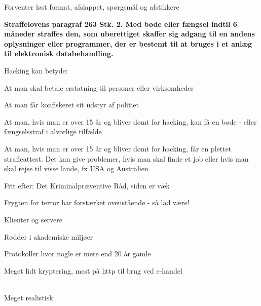 \documentclass[20pt,landscape,a4paper,footrule]{foils}
\begin{document}
\vskip 2cm

\centerline{Forventer løst format, afslappet, spørgsmål og afstikkere \smiley}


{\bfseries Straffelovens paragraf 263 Stk. 2. Med bøde eller fængsel
  indtil 6 måneder
straffes den, som uberettiget skaffer sig adgang til en andens
oplysninger eller programmer, der er bestemt til at bruges i et anlæg
til elektronisk databehandling.}

Hacking kan betyde:
\begin{list2}
\item At man skal betale erstatning til personer eller virksomheder
\item At man får konfiskeret sit udstyr af politiet
\item At man, hvis man er over 15 år og bliver dømt for hacking, kan
  få en bøde - eller fængselsstraf i alvorlige tilfælde
\item At man, hvis man er over 15 år og bliver dømt for hacking, får
en plettet straffeattest. Det kan give problemer, hvis man skal finde
et job eller hvis man skal rejse til visse lande, fx USA og
Australien
\item Frit efter:  Det
  Kriminalpræventive Råd, siden er væk
\item Frygten for terror har forstærket ovenstående - så lad være!
\end{list2}




\begin{list1}
\item Klienter og servere
\item Rødder i akademiske miljøer
\item Protokoller hvor nogle er mere end 20 år gamle
\item Meget lidt kryptering, mest på http til brug ved e-handel
\end{list1}



\\
Meget realistisk 


\end{document}
